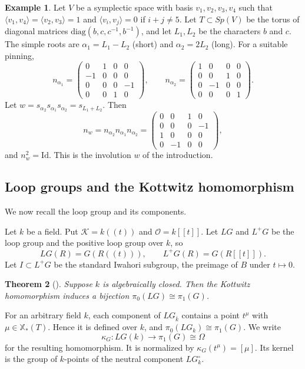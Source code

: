 \documentclass[psamsfonts]{amsart}
\newtheorem{thm}{Theorem}[section]
\theoremstyle{definition}
\newtheorem{exmp}[thm]{Example}
\theoremstyle{remark}
\numberwithin{equation}{section}
\newcommand{\X}{\mathbb{X}}
\newcommand{\diag}{\text{diag}}
\newcommand{\ra}{\rightarrow}
\newcommand\cK{\mathcal{K}}
\newcommand\cO{\mathcal{O}}
\numberwithin{equation}{section}
\newcommand{\Om}{\Omega}
\newcommand{\Id}{\mathrm{Id}}
\theoremstyle{plain}
\begin{document}
\begin{exmp}\label{exmp:sp4}
Let $V$ be a symplectic space with basis $v_1,v_2,v_3,v_4$ such that $\langle v_1,v_4\rangle=\langle v_2,v_3\rangle=1$ and $\langle v_i,v_j\rangle=0$ if $i+j\neq5$. Let $T\subset Sp(V)$ be the torus of diagonal matrices $\diag(b,c,c^{-1},b^{-1})$, and let $L_1,L_2$ be the characters $b$ and $c$. The simple roots are $\alpha_1=L_1-L_2$ (short) and $\alpha_2=2L_2$ (long). For a suitable pinning,
\[
n_{\alpha_1}=\left(\begin{array}{rrrr}
0&1&0&0\\ -1&0&0&0\\ 0&0&0&-1\\ 0&0&1&0
\end{array}\right),\qquad
n_{\alpha_2}=\left(\begin{array}{rrrr}
1&0&0&0\\ 0&0&1&0\\ 0&-1&0&0\\ 0&0&0&1
\end{array}\right).
\]
Let $w=s_{\alpha_2}s_{\alpha_1}s_{\alpha_2}=s_{L_1+L_2}$. Then
\[
n_w=n_{\alpha_2}n_{\alpha_1}n_{\alpha_2}=\left(\begin{array}{rrrr}
0&0&1&0\\ 0&0&0&-1\\ 1&0&0&0\\ 0&-1&0&0
\end{array}\right),
\]
and $n_w^2=\Id$. This is the involution $w$ of the introduction.
\end{exmp}

\subsection{Loop groups and the Kottwitz homomorphism}\label{subsec:loop}
We now recall the loop group and its components.

Let $k$ be a field. Put $\cK=k(\!(t)\!)$ and $\cO=k[[t]]$. Let $LG$ and $L^+G$ be the loop group and the positive loop group over $k$, so
\[
LG(R)=G(R(\!(t)\!)),\qquad L^+G(R)=G(R[[t]]).
\]
Let $I\subset L^+G$ be the standard Iwahori subgroup, the preimage of $B$ under $t\mapsto0$.

\begin{thm}[{\cite[Theorem~5.1, Corollary~5.3]{PR08}}]\label{thm:PR}
Suppose $k$ is algebraically closed. Then the Kottwitz homomorphism induces a bijection $\pi_0(LG)\cong\pi_1(G)$.
\end{thm}

For an arbitrary field $k$, each component of $LG_{\bar k}$ contains a point $t^{\mu}$ with $\mu\in\X_*(T)$. Hence it is defined over $k$, and $\pi_0(LG_k)\cong\pi_1(G)$. We write
\[
\kappa_G\colon LG(k)\ra\pi_1(G)\cong\Om
\]
for the resulting homomorphism. It is normalized by $\kappa_G(t^{\mu})=[\mu]$. Its kernel is the group of $k$-points of the neutral component $LG_k^{\circ}$.
\end{document}
